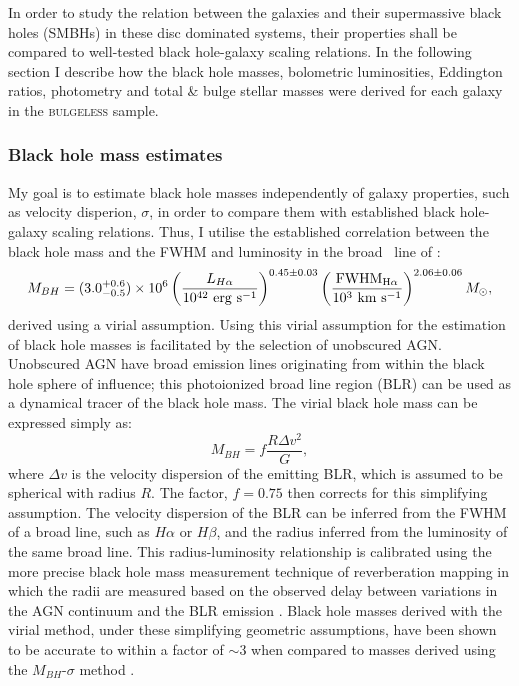 In order to study the relation between the galaxies and their supermassive black holes (SMBHs) in these disc dominated systems, their properties shall be compared to well-tested black hole-galaxy scaling relations. In the following section I describe how the black hole masses, bolometric luminosities, Eddington ratios, photometry and total \& bulge stellar masses were derived for each galaxy in the \textsc{bulgeless} sample. 

\subsubsection{Black hole mass estimates}\label{sec:bhmass}

My goal is to estimate black hole masses independently of galaxy properties, such as velocity disperion, $\sigma$, in order to compare them with established black hole-galaxy scaling relations. Thus, I utilise the established correlation between the black hole mass and the FWHM and luminosity in the broad \ha\ line of \citet{gh07a}: 
\begin{equation}\label{greeneho}
M_{BH} = (3.0^{+0.6}_{-0.5}) \times 10^6 \left ( \frac{L_{H\alpha}}{10^{42} ~\rm{erg}~\rm{s}^{-1}} \right )^{0.45\pm0.03} \left ( \frac{\rm{FWHM}_{H\alpha}}{10^{3}~\rm{km}~\rm{s}^{-1}} \right )^{2.06\pm0.06} M_{\odot},
\end{equation}
derived using a virial assumption. Using this virial assumption for the estimation of black hole masses is facilitated by the selection of unobscured AGN. Unobscured AGN have broad emission lines originating from within the black hole sphere of influence; this photoionized broad line region (BLR) can be used as a dynamical tracer of the black hole mass. The virial black hole mass \citep{peterson14} can be expressed simply as:
\begin{equation}\label{eq:virial}
M_{BH} = f \frac{R\Delta v^2}{G},
\end{equation}
where $\Delta v$ is the velocity dispersion of the emitting BLR, which is assumed to be spherical with radius $R$. The factor, $f = 0.75$ \citep{netzer90} then corrects for this simplifying assumption. The velocity dispersion of the BLR can be inferred from the FWHM of a broad line, such as $H\alpha$ or $H\beta$, and the radius inferred from the luminosity of the same broad line. This radius-luminosity relationship is calibrated using the more precise black hole mass measurement technique of reverberation mapping \citep{blandford82, peterson01, barth15} in which the radii are measured based on the observed delay between variations in the AGN continuum and the BLR emission \citep{kaspi05, bentz06}. Black hole masses derived with the virial method, under these simplifying geometric assumptions, have been shown to be accurate to within a factor of $\sim 3$ when compared to masses derived using the $M_{BH}$-$\sigma$ method \citep[][and see Section~\ref{agnsample}]{ferrarese01, nelson04, onken04}.

